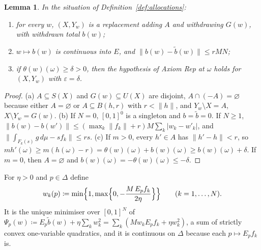 \documentclass[11pt]{article}
\newtheorem{lemma}[theorem]{Lemma}
\theoremstyle{definition}
\theoremstyle{remark}
\begin{document}
\begin{lemma}\label{lem:allocations}
In the situation of Definition~\ref{def:allocations}:
\begin{enumerate}[label=(\alph*)]
\item for every $w$, $(X,Y_w)$ is a replacement adding $A$ and withdrawing $G(w)$, with withdrawn total $b(w)$;
\item $w\mapsto b(w)$ is continuous into $E$, and $\|b(w)-\tilde b(w)\|\le rMN$;
\item if $\theta(w)(\omega)\ge\delta>0$, then the hypothesis of Axiom Rep at $\omega$ holds for $(X,Y_w)$ with $\varepsilon=\delta$.
\end{enumerate}
\end{lemma}
\begin{proof}
(a) $A\subseteq S(X)$ and $G(w)\subseteq U(X)$ are disjoint, $A\cap(-A)=\varnothing$ because either $A=\varnothing$ or $A\subseteq B(h,r)$ with $r<\|h\|$, and $Y_w\setminus X=A$, $X\setminus Y_w=G(w)$. (b) If $N=0$, $[0,1]^0$ is a singleton and $b=\tilde b=0$. If $N\ge1$, $\|b(w)-b(w')\|\le(\max_k\|f_k\|+r)M\sum_k|w_k-w'_k|$, and $\|\int_{F_k(s)}g\,d\mu-sf_k\|\le rs$. (c) If $m>0$, every $h'\in A$ has $\|h'-h\|<r$, so $mh'(\omega)\ge m(h(\omega)-r)=\theta(w)(\omega)+b(w)(\omega)\ge b(w)(\omega)+\delta$. If $m=0$, then $A=\varnothing$ and $b(w)(\omega)=-\theta(w)(\omega)\le-\delta$.
\end{proof}

For $\eta>0$ and $p\in\Delta$ define
\[
w_k(p)\coloneqq\min\Bigl\{1,\max\Bigl\{0,-\frac{M\,E_pf_k}{2\eta}\Bigr\}\Bigr\}\qquad(k=1,\dots,N).
\]
It is the unique minimiser over $[0,1]^N$ of $\Psi_p(w)\coloneqq E_p\tilde b(w)+\eta\sum_kw_k^2=\sum_k(Mw_kE_pf_k+\eta w_k^2)$, a sum of strictly convex one-variable quadratics, and it is continuous on $\Delta$ because each $p\mapsto E_pf_k$ is.
\end{document}
